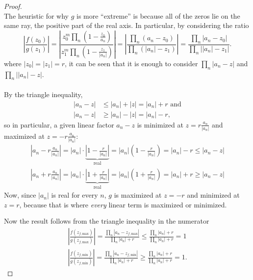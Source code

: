 \documentclass{article}
\begin{document}
\begin{proof} \text{} \\
  The heuristic for why $g$ is more ``extreme'' is because all of the zeros lie
  on the same ray, the positive part of the real axis. In particular, by
  considering the ratio \[
    \left|\frac{f(z_0)}{g(z_1)}\right|
    = \left|
      \frac{\displaystyle z_0^m \prod_n \left(1-\frac{z_0}{a_n}\right)}
      {\displaystyle z_1^m \prod_n \left(1 - \frac{z_1}{|a_n|}\right)}
    \right|
    = \left|
      \frac{\displaystyle \prod_n \left(a_n - z_0\right)}
      {\displaystyle \prod_n \left(|a_n| - z_1\right)}
    \right|
    =
      \frac{\displaystyle \prod_n \left|a_n - z_0\right|}
      {\displaystyle \prod_n \left||a_n| - z_1\right|}.
  \] where $|z_0| = |z_1| = r$, it can be seen that it is enough to consider
  $\prod_n \left|a_n - z\right|$ and $\prod_n \left||a_n| - z\right|$.
  \\~\\
  By the triangle inequality,
  \begin{align*}
    |a_n - z| &\leq |a_n| + |z| = |a_n| + r \text{ and}\\
    |a_n - z| &\geq |a_n| - |z| = |a_n| - r,
  \end{align*} so in particular, a given linear factor $a_n - z$ is minimized at
  $\displaystyle z = r\frac{a_n}{|a_n|}$ and maximized at
  $\displaystyle z = -r\frac{a_n}{|a_n|}$: \begin{align}
    \left|a_n - r\frac{a_n}{|a_n|}\right|
      = |a_n|\cdot\underbrace{\left|1 - \frac{r}{|a_n|}\right|}_\text{real}
      = |a_n|\left(1 - \frac{r}{|a_n|}\right)
      = |a_n| - r
      \leq |a_n - z|\\
    \left|a_n + r\frac{a_n}{|a_n|}\right|
      = |a_n|\cdot\underbrace{\left|1 + \frac{r}{|a_n|}\right|}_\text{real}
      = |a_n|\left(1 + \frac{r}{|a_n|}\right)
      = |a_n| + r
      \geq |a_n - z|
  \end{align}
  Now, since $|a_n|$ is real for every $n$, $g$ is maximized at $z = -r$ and
  minimized at $z = r$, because that is where \textit{every} linear term is
  maximized or minimized.

  Now the result follows from the triangle inequality in the numerator \begin{align*}
    \left|\frac{f(z_{f,\text{max}})}{g(z_{f,\text{max}})}\right|
    = \frac{\displaystyle \prod_n \left|a_n - z_{f,\text{max}}\right|}
    {\displaystyle \prod_n |a_n| + r}
    \leq \frac{\displaystyle \prod_n |a_n| + r}
    {\displaystyle \prod_n |a_n| + r}
    = 1\\
    \left|\frac{f(z_{f,\text{min}})}{g(z_{f,\text{min}})}\right|
    = \frac{\displaystyle \prod_n \left|a_n - z_{f,\text{min}}\right|}
    {\displaystyle \prod_n |a_n| + r}
    \geq \frac{\displaystyle \prod_n |a_n| + r}
    {\displaystyle \prod_n |a_n| + r}
    = 1.
  \end{align*}
\end{proof}
\end{document}
